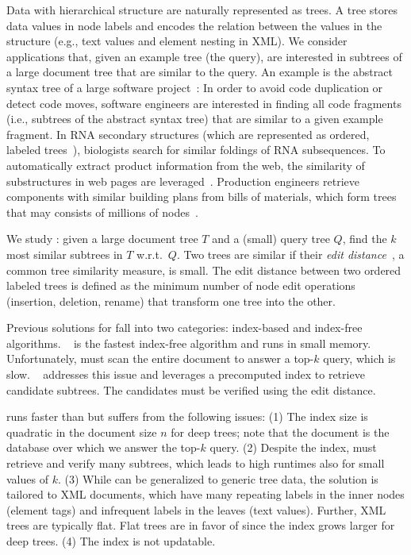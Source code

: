 
Data with hierarchical structure are naturally represented as trees. A tree stores data values in node labels and encodes the relation between the values in the structure (e.g., text values and element nesting in XML). We consider applications that, given an example tree (the query), are interested in subtrees of a large document tree that are similar to the query. An example is the abstract syntax tree of a large software project~\cite{simian-2019, falleri-ase-2014}: In order to avoid code duplication or detect code moves, software engineers are interested in finding all code fragments (i.e., subtrees of the abstract syntax tree) that are similar to a given example fragment. In RNA secondary structures (which are represented as ordered, labeled trees~\cite{herrbach-tcs-2010, akutsu-ieice-2010}), biologists search for similar foldings of RNA subsequences. To automatically extract product information from the web, the similarity of substructures in web pages are leveraged~\cite{vidal-sigir-2006}. Production engineers retrieve components with similar building plans from bills of materials, which form trees that may consists of millions of nodes~\cite{finis-sigmod-2013,kashkoush-cirp-2013}.

We study \emph{\tssqs{}}: given a large document tree $T$ and a (small) query tree $Q$, find the $k$ most similar subtrees in $T$ w.r.t.\ $Q$. Two trees are similar if their \emph{edit distance}~\cite{zhang-siam-1989}, a common tree similarity measure, is small. The edit distance between two ordered labeled trees is defined as the minimum number of node edit operations (insertion, deletion, rename) that transform one tree into the other.

Previous solutions for \tssqs{} fall into two categories: index-based and index-free algorithms. \tasmpostorder{}~\cite{augsten-icde-2010} is the fastest index-free algorithm and runs in small memory. Unfortunately, \tasmpostorder{} must scan the entire document to answer a top-$k$ query, which is slow.  \structuresearch{}~\cite{cohen-sigmod-2013} addresses this issue and leverages a precomputed index to retrieve candidate subtrees. The candidates must be verified using the edit distance.

\structuresearch{} runs faster than \tasmpostorder{} but suffers from the following issues: (1) The index size is quadratic in the  document size $n$ for deep trees; note that the document is the database over which we answer the top-$k$ query. (2) Despite the index, \structuresearch{} must retrieve and verify many subtrees, which leads to high runtimes also for small values of $k$. (3) While \structuresearch{} can be generalized to generic tree data, the solution is tailored to XML documents, which have many repeating labels in the inner nodes (element tags) and infrequent labels in the leaves (text values). Further, XML trees are typically flat. Flat trees are in favor of \structuresearch{} since the index grows larger for deep trees. (4) The index is not updatable.

